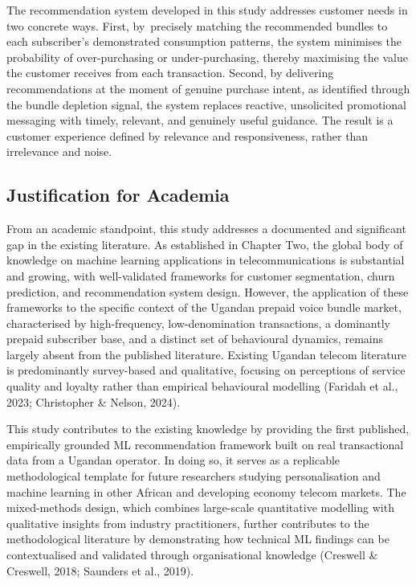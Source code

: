 The recommendation system developed in this study addresses customer needs in two concrete ways. First, by precisely matching the recommended bundles to each subscriber's demonstrated consumption patterns, the system minimises the probability of over-purchasing or under-purchasing, thereby maximising the value the customer receives from each transaction. Second, by delivering recommendations at the moment of genuine purchase intent, as identified through the bundle depletion signal, the system replaces reactive, unsolicited promotional messaging with timely, relevant, and genuinely useful guidance. The result is a customer experience defined by relevance and responsiveness, rather than irrelevance and noise.


\subsection{Justification for Academia}

From an academic standpoint, this study addresses a documented and significant gap in the existing literature. As established in Chapter Two, the global body of knowledge on machine learning applications in telecommunications is substantial and growing, with well-validated frameworks for customer segmentation, churn prediction, and recommendation system design. However, the application of these frameworks to the specific context of the Ugandan prepaid voice bundle market, characterised by high-frequency, low-denomination transactions, a dominantly prepaid subscriber base, and a distinct set of behavioural dynamics, remains largely absent from the published literature. Existing Ugandan telecom literature is predominantly survey-based and qualitative, focusing on perceptions of service quality and loyalty rather than empirical behavioural modelling (Faridah et al., 2023; Christopher \& Nelson, 2024).

This study contributes to the existing knowledge by providing the first published, empirically grounded ML recommendation framework built on real transactional data from a Ugandan operator. In doing so, it serves as a replicable methodological template for future researchers studying personalisation and machine learning in other African and developing economy telecom markets. The mixed-methods design, which combines large-scale quantitative modelling with qualitative insights from industry practitioners, further contributes to the methodological literature by demonstrating how technical ML findings can be contextualised and validated through organisational knowledge (Creswell \& Creswell, 2018; Saunders et al., 2019).

